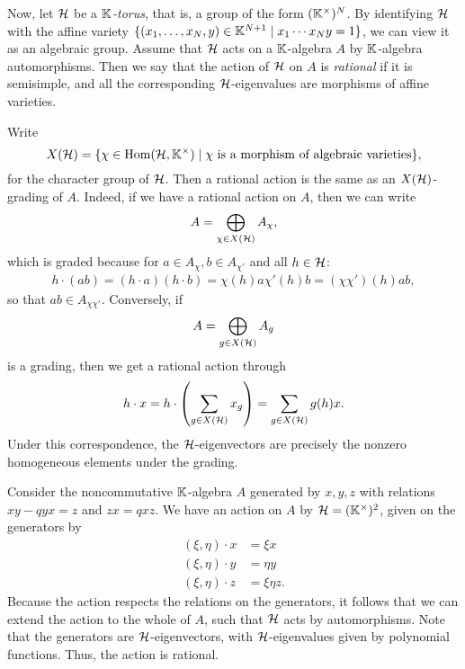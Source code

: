 Now, let $\mathcal{H}$ be a \emph{$\mathbb{K}$-torus}, that is, a group of the form
$(\mathbb{K}^\times)^N$. By identifying $\mathcal{H}$ with the affine variety $\{(x_1, \dots, x_N,
	y) \in \mathbb{K}^{N+1} \mid x_1 \cdots x_N y = 1\}$, we can view it as an algebraic group.
Assume that $\mathcal{H}$ acts on a $\mathbb{K}$-algebra $A$ by $\mathbb{K}$-algebra automorphisms. Then
we say that the action of $\mathcal{H}$ on $A$ is \emph{rational} if it
is semisimple, and all the corresponding $\mathcal{H}$-eigenvalues are morphisms of affine
varieties.

Write
\begin{equation*}
	X(\mathcal{H}) = \{\chi \in \operatorname{Hom}(\mathcal{H}, \mathbb{K}^\times) \mid \chi \text{ is a morphism of algebraic varieties}\},
\end{equation*}
%
for the character group of $\mathcal{H}$. Then a rational action is the
same as an $X(\mathcal{H})$-grading of $A$. Indeed, if we have a rational
action on $A$, then we can write
\begin{equation*}
	A = \bigoplus_{\chi \in X(\mathcal{H})} A_\chi,
\end{equation*}
which is graded because for $a \in A_\chi, b \in A_{\chi'}$ and all $h \in \mathcal{H}$:
\begin{align*}
	h \cdot (a b) = (h\cdot a)(h\cdot b)= \chi(h)a \chi'(h)b = (\chi \chi')(h)ab,
\end{align*}
so that $ab \in A_{\chi \chi'}$. Conversely, if
\begin{equation*}
	A = \bigoplus_{g \in X(\mathcal{H})} A_g
\end{equation*}
is a grading, then we get a rational action through
\begin{equation*}
	h \cdot x = h \cdot \left(\sum_{g \in X(\mathcal{H})} x_g \right) = \sum_{g \in X(\mathcal{H})} g(h)x.
\end{equation*}
%
Under this correspondence, the $\mathcal{H}$-eigenvectors are precisely the nonzero
homogeneous elements under the grading.

\begin{example}
	Consider the noncommutative $\mathbb{K}$-algebra $A$ generated by $x,y,z$ with relations $xy
		-qyx = z$ and $zx = qxz$. We have an action on $A$ by $\mathcal{H} = (\mathbb{K}^\times)^2$, given
	on the generators by
	\begin{align*}
		(\xi, \eta)\cdot x & = \xi x      \\
		(\xi, \eta)\cdot y & = \eta y     \\
		(\xi, \eta)\cdot z & = \xi\eta z.
	\end{align*}
	Because the action respects the relations on the generators, it follows that we can
	extend the action to the whole of $A$, such that $\mathcal{H}$ acts by automorphisms. Note
	that the generators are $\mathcal{H}$-eigenvectors, with $\mathcal{H}$-eigenvalues given by
	polynomial functions. Thus, the action is rational.

\end{example}

